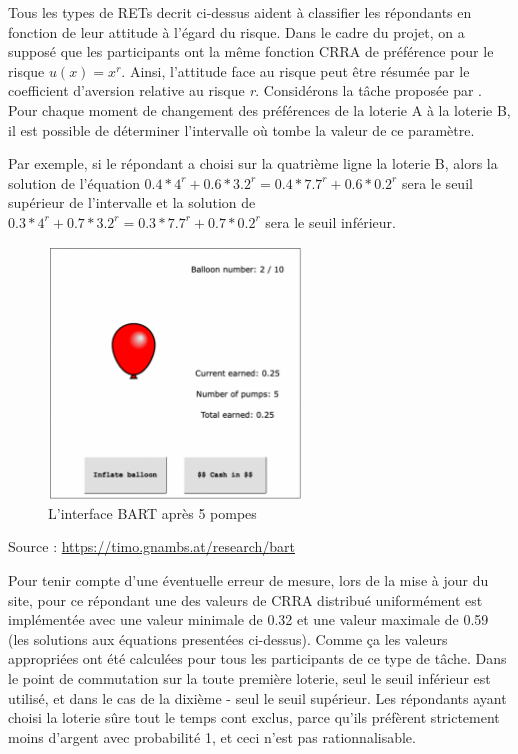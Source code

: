 \documentclass[12pt]{article}
\begin{document}
Tous les types de RETs decrit ci-dessus aident à classifier les
répondants en fonction de leur attitude à l'égard du risque. Dans le
cadre du projet, on a supposé que les participants ont la même fonction
CRRA de préférence pour le risque \(u(x) = x^r\). Ainsi, l'attitude face
au risque peut être résumée par le coefficient d'aversion relative au
risque \emph{r}. Considérons la tâche proposée par \citet{Holt2002}.
Pour chaque moment de changement des préférences de la loterie A à la
loterie B, il est possible de déterminer l'intervalle où tombe la valeur
de ce paramètre.

Par exemple, si le répondant a choisi sur la quatrième ligne la loterie
B, alors la solution de l'équation
\(0.4*4^r + 0.6*3.2^r = 0.4*7.7^r + 0.6*0.2^r\) sera le seuil supérieur
de l'intervalle et la solution de
\(0.3*4^r + 0.7*3.2^r = 0.3*7.7^r + 0.7*0.2^r\) sera le seuil inférieur.

\begin{figure}
\centering
\includegraphics[width=0.6\textwidth,height=0.4\textheight]{BART.png}
\caption{L'interface BART après 5 pompes}
\end{figure}

Source : \url{https://timo.gnambs.at/research/bart}

Pour tenir compte d'une éventuelle erreur de mesure, lors de la mise à
jour du site, pour ce répondant une des valeurs de CRRA distribué
uniformément est implémentée avec une valeur minimale de 0.32 et une
valeur maximale de 0.59 (les solutions aux équations presentées
ci-dessus). Comme ça les valeurs appropriées ont été calculées pour tous
les participants de ce type de tâche. Dans le point de commutation sur
la toute première loterie, seul le seuil inférieur est utilisé, et dans
le cas de la dixième - seul le seuil supérieur. Les répondants ayant
choisi la loterie sûre tout le temps cont exclus, parce qu'ils préfèrent
strictement moins d'argent avec probabilité 1, et ceci n'est pas
rationnalisable.
\end{document}
